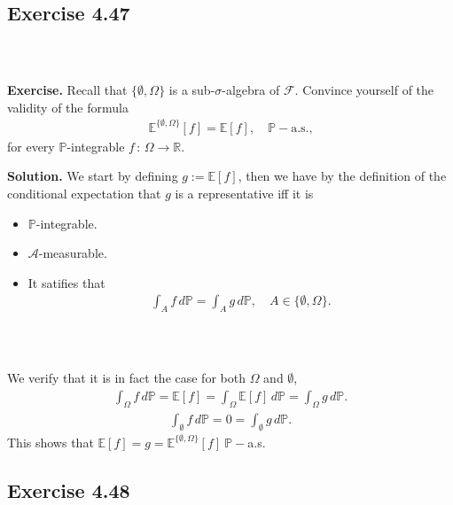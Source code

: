 \documentclass{beamer}
\numberwithin{equation}{section}
\newenvironment{frame2}{\begin{frame}\frametitle{{\normalsize \secname} \\ {\large \subsecname}}}{\end{frame}}
\begin{document}
\subsection{Exercise 4.47}

\begin{frame2}
    \textbf{Exercise.}
    Recall that $\{\emptyset,\Omega\}$ is a sub-$\sigma$-algebra of $\mathcal{F}$.
    Convince yourself of the validity of the formula
    \begin{align}
        \mathbb{E}^{\{\emptyset,\Omega\}}[f] = \mathbb{E}[f],\quad \mathbb{P}-\text{a.s.,}
    \end{align}
    for every $\mathbb{P}$-integrable $f \, : \, \Omega \rightarrow \mathbb{R}$.

    \vspace{10pt}
    \textbf{Solution.}
    We start by defining $g := \mathbb{E}\left[f\right]$, then we have by the definition of the conditional expectation that $g$ is a representative iff it is
    \begin{itemize}
        \item $\mathbb{P}$-integrable.
        \item $\mathcal{A}$-measurable.
        \item It satifies that
        \begin{align}
            \int_Af\, d\mathbb{P} = \int_Ag\, d\mathbb{P}, \quad A \in \{\emptyset,\Omega\}.
        \end{align}
    \end{itemize} 
\end{frame2}

\begin{frame2}
    We verify that it is in fact the case for both $\Omega$ and $\emptyset$,
    \begin{align}
        \int_\Omega f\, d\mathbb{P} = \mathbb{E}\left[f\right] = \int_\Omega\mathbb{E}\left[f\right] \, d\mathbb{P} = \int_\Omega g\, d\mathbb{P}.
    \end{align}
    \begin{align}
        \int_\emptyset f\, d\mathbb{P} = 0 = \int_\emptyset g\, d\mathbb{P}.
    \end{align}
    This shows that $\mathbb{E}\left[f\right] = g = \mathbb{E}^{\{\emptyset,\Omega\}}\left[f\right] \ \mathbb{P}-$a.s.\!
\end{frame2}

\subsection{Exercise 4.48}
\end{document}
